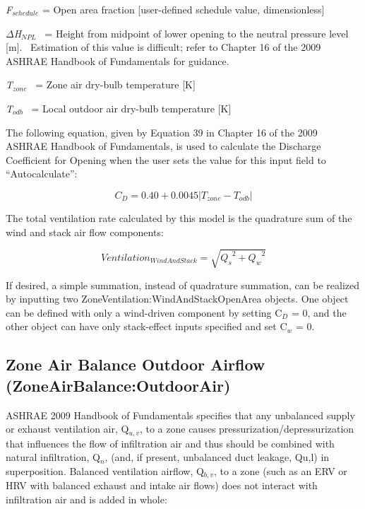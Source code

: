 \emph{F\(_{schedule}\)} = Open area fraction {[}user-defined schedule value, dimensionless{]}

\emph{$\Delta$H\(_{NPL}\)}~ = Height from midpoint of lower opening to the neutral pressure level {[}m{]}.~ Estimation of this value is difficult; refer to Chapter 16 of the 2009 ASHRAE Handbook of Fundamentals for guidance.

\emph{T\(_{zone}\)}~ = Zone air dry-bulb temperature {[}K{]}

\emph{T\(_{odb}\)}~ = Local outdoor air dry-bulb temperature {[}K{]}

The following equation, given by Equation 39 in Chapter 16 of the 2009 ASHRAE Handbook of Fundamentals, is used to calculate the Discharge Coefficient for Opening when the user sets the value for this input field to ``Autocalculate'':

\begin{equation}
{C_D} = 0.40 + 0.0045\left| {{T_{zone}} - {T_{odb}}} \right|
\end{equation}

The total ventilation rate calculated by this model is the quadrature sum of the wind and stack air flow components:

\begin{equation}
Ventilatio{n_{WindAndStack}} = \sqrt {{Q_s}^2 + {Q_w}^2}
\end{equation}

If desired, a simple summation, instead of quadrature summation, can be realized by inputting two ZoneVentilation:WindAndStackOpenArea objects. One object can be defined with only a wind-driven component by setting C\(_{D}\) = 0, and the other object can have only stack-effect inputs specified and set C\(_{w}\) = 0.

\subsection{Zone Air Balance Outdoor Airflow (ZoneAirBalance:OutdoorAir)}\label{zone-air-balance-outdoor-airflow-zoneairbalanceoutdoorair}

ASHRAE 2009 Handbook of Fundamentals specifies that any unbalanced supply or exhaust ventilation air, Q\(_{u,v}\), to a zone causes pressurization/depressurization that influences the flow of infiltration air and thus should be combined with natural infiltration, Q\(_{n}\), (and, if present, unbalanced duct leakage, Qu,l) in superposition. Balanced ventilation airflow, Q\(_{b,v}\), to a zone (such as an ERV or HRV with balanced exhaust and intake air flows) does not interact with infiltration air and is added in whole:

